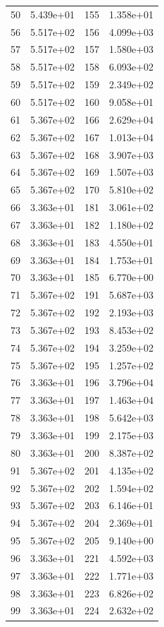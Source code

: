 \documentclass[12pt]{article}
\begin{document}
\begin{longtable}{@{}cccc@{}}
50 & 5.439e+01 & 155 & 1.358e+01 \\
56 & 5.517e+02 & 156 & 4.099e+03 \\
57 & 5.517e+02 & 157 & 1.580e+03 \\
58 & 5.517e+02 & 158 & 6.093e+02 \\
59 & 5.517e+02 & 159 & 2.349e+02 \\
60 & 5.517e+02 & 160 & 9.058e+01 \\
61 & 5.367e+02 & 166 & 2.629e+04 \\
62 & 5.367e+02 & 167 & 1.013e+04 \\
63 & 5.367e+02 & 168 & 3.907e+03 \\
64 & 5.367e+02 & 169 & 1.507e+03 \\
65 & 5.367e+02 & 170 & 5.810e+02 \\
66 & 3.363e+01 & 181 & 3.061e+02 \\
67 & 3.363e+01 & 182 & 1.180e+02 \\
68 & 3.363e+01 & 183 & 4.550e+01 \\
69 & 3.363e+01 & 184 & 1.753e+01 \\
70 & 3.363e+01 & 185 & 6.770e+00 \\
71 & 5.367e+02 & 191 & 5.687e+03 \\
72 & 5.367e+02 & 192 & 2.193e+03 \\
73 & 5.367e+02 & 193 & 8.453e+02 \\
74 & 5.367e+02 & 194 & 3.259e+02 \\
75 & 5.367e+02 & 195 & 1.257e+02 \\
76 & 3.363e+01 & 196 & 3.796e+04 \\
77 & 3.363e+01 & 197 & 1.463e+04 \\
78 & 3.363e+01 & 198 & 5.642e+03 \\
79 & 3.363e+01 & 199 & 2.175e+03 \\
80 & 3.363e+01 & 200 & 8.387e+02 \\
91 & 5.367e+02 & 201 & 4.135e+02 \\
92 & 5.367e+02 & 202 & 1.594e+02 \\
93 & 5.367e+02 & 203 & 6.146e+01 \\
94 & 5.367e+02 & 204 & 2.369e+01 \\
95 & 5.367e+02 & 205 & 9.140e+00 \\
96 & 3.363e+01 & 221 & 4.592e+03 \\
97 & 3.363e+01 & 222 & 1.771e+03 \\
98 & 3.363e+01 & 223 & 6.826e+02 \\
99 & 3.363e+01 & 224 & 2.632e+02 \\

\end{longtable}
\end{document}
